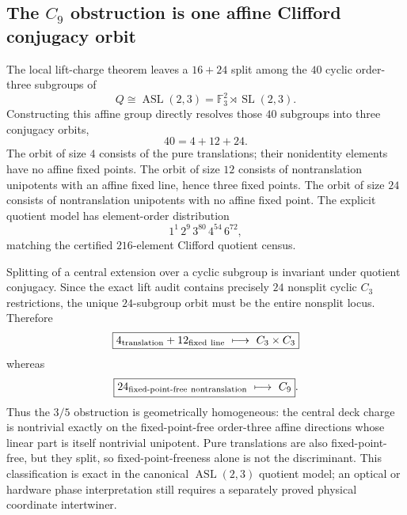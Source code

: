 \subsection{The $C_9$ obstruction is one affine Clifford conjugacy orbit}

The local lift-charge theorem leaves a $16+24$ split among the $40$ cyclic order-three subgroups of
\[
Q\cong\operatorname{ASL}(2,3)=\mathbb F_3^2\rtimes\operatorname{SL}(2,3).
\]
Constructing this affine group directly resolves those $40$ subgroups into three conjugacy orbits,
\[
\boxed{40=4+12+24}.
\]
The orbit of size $4$ consists of the pure translations; their nonidentity elements have no affine fixed points.  The orbit of size $12$ consists of nontranslation unipotents with an affine fixed line, hence three fixed points.  The orbit of size $24$ consists of nontranslation unipotents with no affine fixed point.  The explicit quotient model has element-order distribution
\[
1^1\,2^9\,3^{80}\,4^{54}\,6^{72},
\]
matching the certified $216$-element Clifford quotient census.

Splitting of a central extension over a cyclic subgroup is invariant under quotient conjugacy.  Since the exact lift audit contains precisely $24$ nonsplit cyclic $C_3$ restrictions, the unique $24$-subgroup orbit must be the entire nonsplit locus.  Therefore
\[
\boxed{4_{\rm translation}+12_{\rm fixed\ line}\ \longmapsto\ C_3\times C_3}
\]
whereas
\[
\boxed{24_{\rm fixed\text{-}point\text{-}free\ nontranslation}\ \longmapsto\ C_9}.
\]
Thus the $3/5$ obstruction is geometrically homogeneous: the central deck charge is nontrivial exactly on the fixed-point-free order-three affine directions whose linear part is itself nontrivial unipotent.  Pure translations are also fixed-point-free, but they split, so fixed-point-freeness alone is not the discriminant.  This classification is exact in the canonical $\operatorname{ASL}(2,3)$ quotient model; an optical or hardware phase interpretation still requires a separately proved physical coordinate intertwiner.
